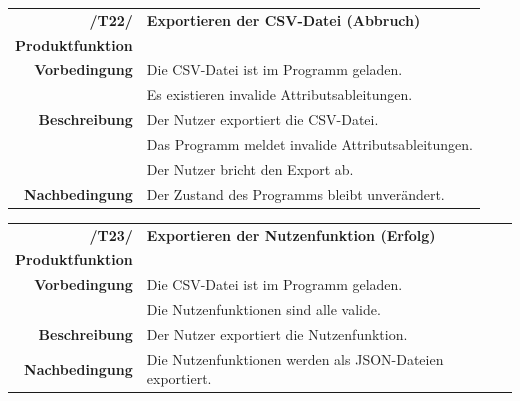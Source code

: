 \documentclass{article}
\begin{document}
\begin{table}[H]
\begin{tabularx}{\textwidth}{rX}
 \vspace{1mm}
\textbf{/T22/}         & \textbf{Exportieren der CSV-Datei (Abbruch)} \\ \vspace{1mm}
\textbf{Produktfunktion} & \nameref{sec:f:CSV-Datei exportieren} \\
\textbf{Vorbedingung}  & Die CSV-Datei ist im Programm geladen. \\  \vspace{1mm}& Es existieren invalide Attributsableitungen. \\
\textbf{Beschreibung}  & Der Nutzer exportiert die CSV-Datei. \\ & Das Programm meldet invalide Attributsableitungen. \\ \vspace{1mm} & Der Nutzer bricht den Export ab. \\
\textbf{Nachbedingung} & Der Zustand des Programms bleibt unverändert.
\end{tabularx}
\end{table}

\begin{table}[H]
\begin{tabularx}{\textwidth}{rX}
\vspace{1mm}
\textbf{/T23/}         & \textbf{Exportieren der Nutzenfunktion (Erfolg)} \\ \vspace{1mm}
\textbf{Produktfunktion} & \nameref{sec:f:Alternativen exportieren} \\
\textbf{Vorbedingung}  & Die CSV-Datei ist im Programm geladen. \\  \vspace{1mm}& Die Nutzenfunktionen sind alle valide. \\
\textbf{Beschreibung}  & Der Nutzer exportiert die Nutzenfunktion. \\
\textbf{Nachbedingung} & Die Nutzenfunktionen werden als JSON-Dateien exportiert.
\end{tabularx}
\end{table}
\end{document}
